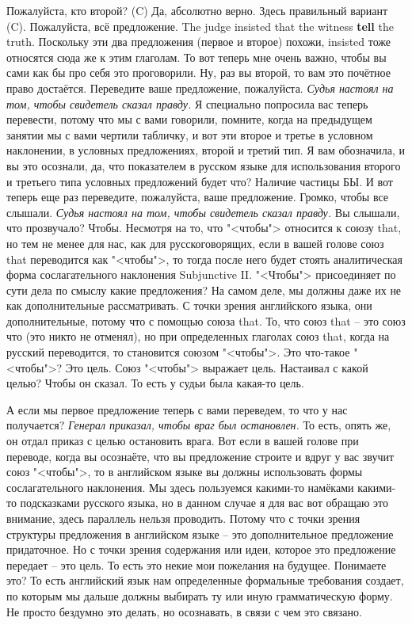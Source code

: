 \documentclass[main.tex]{subfiles}
\begin{document}
Пожалуйста, кто второй?
(C)
Да, абсолютно верно.
Здесь правильный вариант (C).
Пожалуйста, всё предложение.
The judge insisted that the witness \textbf{tell} the truth.
Поскольку эти два предложения (первое и второе) похожи, insisted тоже относятся сюда же к этим глаголам.
То вот теперь мне очень важно, чтобы вы сами как бы про себя это проговорили.
Ну, раз вы второй, то вам это почётное право достаётся.
Переведите ваше предложение, пожалуйста.
\textit{Судья настоял на том, чтобы свидетель сказал правду.}
Я специально попросила вас теперь перевести, потому что мы с вами говорили, помните, когда на предыдущем занятии мы с вами чертили табличку, и вот эти второе и третье в условном наклонении, в условных предложениях, второй и третий тип.
Я вам обозначила, и вы это осознали, да, что показателем в русском языке для использования второго и третьего типа условных предложений будет что?
Наличие частицы БЫ.
И вот теперь еще раз переведите, пожалуйста, ваше предложение.
Громко, чтобы все слышали.
\textit{Судья настоял на том, чтобы свидетель сказал правду.}
Вы слышали, что прозвучало?
Чтобы.
Несмотря на то, что "<чтобы"> относится к союзу that, но тем не менее для нас, как для русскоговорящих, если в вашей голове союз that переводится как "<чтобы">, то тогда после него будет стоять аналитическая форма сослагательного наклонения Subjunctive II.
"<Чтобы"> присоединяет по сути дела по смыслу какие предложения?
На самом деле, мы должны даже их не как дополнительные рассматривать.
С точки зрения английского языка, они дополнительные, потому что с помощью союза that.
То, что союз that -- это союз что (это никто не отменял), но при определенных глаголах союз that, когда на русский переводится, то становится союзом "<чтобы">.
Это что-такое "<чтобы">?
Это цель.
Союз "<чтобы"> выражает цель.
Настаивал с какой целью?
Чтобы он сказал.
То есть у судьи была какая-то цель.

А если мы первое предложение теперь с вами переведем, то что у нас получается?
\textit{Генерал приказал, чтобы враг был остановлен.}
То есть, опять же, он отдал приказ с целью остановить врага.
Вот если в вашей голове при переводе, когда вы осознаёте, что вы предложение строите и вдруг у вас звучит союз "<чтобы">, то в английском языке вы должны использовать формы сослагательного наклонения.
Мы здесь пользуемся какими-то намёками какими-то подсказками русского языка, но в данном случае я для вас вот обращаю это внимание, здесь параллель нельзя проводить.
Потому что с точки зрения структуры предложения в английском языке -- это дополнительное предложение придаточное.
Но с точки зрения содержания или идеи, которое это предложение передает -- это цель.
То есть это некие мои пожелания на будущее.
Понимаете это?
То есть английский язык нам определенные формальные требования создает, по которым мы дальше должны выбирать ту или иную грамматическую форму.
Не просто бездумно это делать, но осознавать, в связи с чем это связано.
\end{document}
